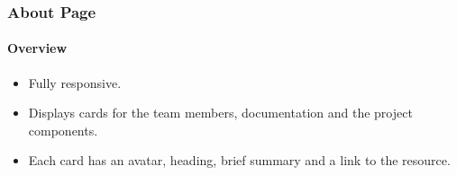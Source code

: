\subsubsection{About Page}
\paragraph{Overview\newline}
\begin{itemize}
    \item Fully responsive.
    \item Displays cards for the team members, documentation and the project components.
    \item Each card has an avatar, heading, brief summary and a link to the resource.
\end{itemize}

